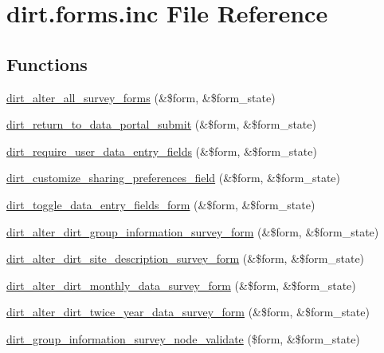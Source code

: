 \hypertarget{dirt_8forms_8inc}{}\section{dirt.\+forms.\+inc File Reference}
\label{dirt_8forms_8inc}
\subsection*{Functions}
\begin{DoxyCompactItemize}
\item 
\mbox{\hyperlink{dirt_8forms_8inc_a31bcdad84714fcd51eb6917d2fbb5285}{dirt\+\_\+alter\+\_\+all\+\_\+survey\+\_\+forms}} (\&\$form, \&\$form\+\_\+state)
\item 
\mbox{\hyperlink{dirt_8forms_8inc_a5f34dda2c7e7319f00bd5775e2cc955a}{dirt\+\_\+return\+\_\+to\+\_\+data\+\_\+portal\+\_\+submit}} (\&\$form, \&\$form\+\_\+state)
\item 
\mbox{\hyperlink{dirt_8forms_8inc_a2828482d5325e865c7a445431a3a08f5}{dirt\+\_\+require\+\_\+user\+\_\+data\+\_\+entry\+\_\+fields}} (\&\$form, \&\$form\+\_\+state)
\item 
\mbox{\hyperlink{dirt_8forms_8inc_a988fc3a3607efe33acd017cae64b692f}{dirt\+\_\+customize\+\_\+sharing\+\_\+preferences\+\_\+field}} (\&\$form, \&\$form\+\_\+state)
\item 
\mbox{\hyperlink{dirt_8forms_8inc_af0973d1b8eb227b50d22fd8849bb032e}{dirt\+\_\+toggle\+\_\+data\+\_\+entry\+\_\+fields\+\_\+form}} (\&\$form, \&\$form\+\_\+state)
\item 
\mbox{\hyperlink{dirt_8forms_8inc_a327e90a7132dde3fb46782f49de09c3e}{dirt\+\_\+alter\+\_\+dirt\+\_\+group\+\_\+information\+\_\+survey\+\_\+form}} (\&\$form, \&\$form\+\_\+state)
\item 
\mbox{\hyperlink{dirt_8forms_8inc_a16c74781f0591ab489c3351b9af8854a}{dirt\+\_\+alter\+\_\+dirt\+\_\+site\+\_\+description\+\_\+survey\+\_\+form}} (\&\$form, \&\$form\+\_\+state)
\item 
\mbox{\hyperlink{dirt_8forms_8inc_a945d37b5f9213c336fe754ce54d24e6c}{dirt\+\_\+alter\+\_\+dirt\+\_\+monthly\+\_\+data\+\_\+survey\+\_\+form}} (\&\$form, \&\$form\+\_\+state)
\item 
\mbox{\hyperlink{dirt_8forms_8inc_aa2ee22ad0cb0895694da99fc4627903d}{dirt\+\_\+alter\+\_\+dirt\+\_\+twice\+\_\+year\+\_\+data\+\_\+survey\+\_\+form}} (\&\$form, \&\$form\+\_\+state)
\item 
\mbox{\hyperlink{dirt_8forms_8inc_a84c4f00138bbc3f65a2e17a967346a13}{dirt\+\_\+group\+\_\+information\+\_\+survey\+\_\+node\+\_\+validate}} (\$form, \&\$form\+\_\+state)

\end{DoxyCompactItemize}
